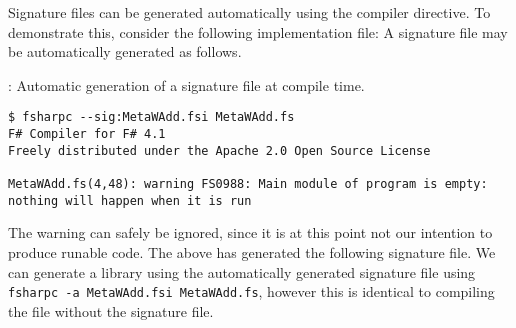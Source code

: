 Signature files can be generated automatically using the  compiler directive. To demonstrate this, consider the following implementation file:
%
%
A signature file may be automatically generated as follows.
\begin{codeNOutput}{: Automatic generation of a signature file at compile time.}
\begin{lstlisting}[language=console,escapechar=§]
$ fsharpc --sig:MetaWAdd.fsi MetaWAdd.fs
F# Compiler for F# 4.1
Freely distributed under the Apache 2.0 Open Source License

MetaWAdd.fs(4,48): warning FS0988: Main module of program is empty: nothing will happen when it is run
\end{lstlisting}%
\end{codeNOutput}
The warning can safely be ignored, since it is at this point not our intention to produce runable code. The above has generated the following signature file.
%
%
We can generate a library using the automatically generated signature file using \lstinline[language=console]{fsharpc -a MetaWAdd.fsi MetaWAdd.fs}, however this is identical to compiling the  file without the signature file.


